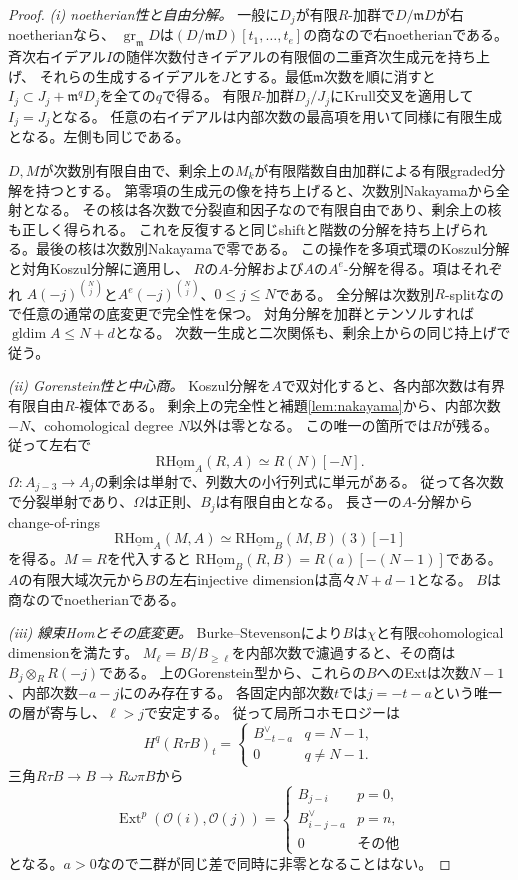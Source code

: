 \documentclass[a4paper,10pt]{ltjsarticle}
\theoremstyle{definition}
\theoremstyle{remark}
\newcommand{\OO}{\mathcal O}
\begin{document}
\begin{proof}
\emph{(i) noetherian性と自由分解。}
一般に$D_j$が有限$R$-加群で$D/\mathfrak mD$が右noetherianなら、
$\operatorname{gr}_{\mathfrak m}D$は$(D/\mathfrak mD)[t_1,\ldots,t_e]$の商なので右noetherianである。
斉次右イデアル$I$の随伴次数付きイデアルの有限個の二重斉次生成元を持ち上げ、
それらの生成するイデアルを$J$とする。最低$\mathfrak m$次数を順に消すと
$I_j\subset J_j+\mathfrak m^qD_j$を全ての$q$で得る。
有限$R$-加群$D_j/J_j$にKrull交叉を適用して$I_j=J_j$となる。
任意の右イデアルは内部次数の最高項を用いて同様に有限生成となる。左側も同じである。

$D,M$が次数別有限自由で、剰余上の$M_k$が有限階数自由加群による有限graded分解を持つとする。
第零項の生成元の像を持ち上げると、次数別Nakayamaから全射となる。
その核は各次数で分裂直和因子なので有限自由であり、剰余上の核も正しく得られる。
これを反復すると同じshiftと階数の分解を持ち上げられる。最後の核は次数別Nakayamaで零である。
この操作を多項式環のKoszul分解と対角Koszul分解に適用し、
$R$の$A$-分解および$A$の$A^e$-分解を得る。項はそれぞれ
$A(-j)^{\binom Nj}$と$A^e(-j)^{\binom Nj}$、$0\le j\le N$である。
全分解は次数別$R$-splitなので任意の通常の底変更で完全性を保つ。
対角分解を加群とテンソルすれば$\operatorname{gldim}A\le N+d$となる。
次数一生成と二次関係も、剰余上からの同じ持上げで従う。

\emph{(ii) Gorenstein性と中心商。}
Koszul分解を$A$で双対化すると、各内部次数は有界有限自由$R$-複体である。
剰余上の完全性と補題\ref{lem:nakayama}から、内部次数$-N$、cohomological degree $N$以外は零となる。
この唯一の箇所では$R$が残る。従って左右で
\[
 \operatorname{R\underline{Hom}}_A(R,A)\simeq R(N)[-N].
\]
$\Omega:A_{j-3}\to A_j$の剰余は単射で、列数大の小行列式に単元がある。
従って各次数で分裂単射であり、$\Omega$は正則、$B_j$は有限自由となる。
長さ一の$A$-分解からchange-of-rings
\[
 \operatorname{R\underline{Hom}}_A(M,A)
 \simeq\operatorname{R\underline{Hom}}_B(M,B)(3)[-1]
\]
を得る。$M=R$を代入すると
$\operatorname{R\underline{Hom}}_B(R,B)=R(a)[-(N-1)]$である。
$A$の有限大域次元から$B$の左右injective dimensionは高々$N+d-1$となる。
$B$は商なのでnoetherianである。

\emph{(iii) 線束Homとその底変更。}
Burke--Stevenson\cite[Lemmas 6.1--6.2]{BS}により$B$は$\chi$と有限cohomological dimensionを満たす。
$M_\ell=B/B_{\ge\ell}$を内部次数で濾過すると、その商は$B_j\otimes_RR(-j)$である。
上のGorenstein型から、これらの$B$へのExtは次数$N-1$、内部次数$-a-j$にのみ存在する。
各固定内部次数$t$では$j=-t-a$という唯一の層が寄与し、$\ell>j$で安定する。
従って局所コホモロジーは
\[
 H^q(R\tau B)_t=
 \begin{cases}B_{-t-a}^\vee&q=N-1,\\0&q\ne N-1.\end{cases}
\]
三角$R\tau B\to B\to R\omega\pi B$から
\[
 \operatorname{Ext}^p(\OO(i),\OO(j))=
 \begin{cases}
 B_{j-i}&p=0,\\ B_{i-j-a}^\vee&p=n,\\0&\text{その他}
 \end{cases}
 \tag{H}\label{eq:line-hom}
\]
となる。$a>0$なので二群が同じ差で同時に非零となることはない。


\end{proof}
\end{document}
